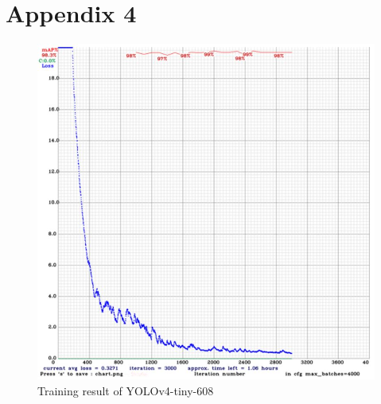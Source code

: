 \documentclass[10pt, letterpaper]{article}
\begin{document}
\section*{Appendix 4}
    \begin{figure}[h]
        \centering
        \includegraphics[width=\textwidth]{fig20.JPG}
        \caption*{Training result of YOLOv4-tiny-608}
    \end{figure}

\pagebreak
\end{document}
